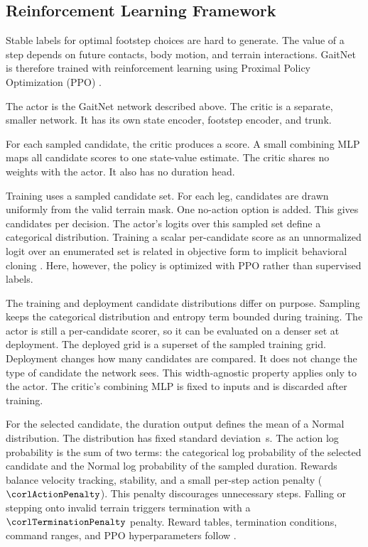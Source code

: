 \subsection{Reinforcement Learning Framework}
\label{subsec:methodology-gaitnet-training}

Stable labels for optimal footstep choices are hard to generate. The
value of a step depends on future contacts, body motion, and terrain
interactions. GaitNet is therefore trained with reinforcement learning
using Proximal Policy Optimization (PPO)
\cite{Schulman_proximal_2017}.

The actor is the GaitNet network described above. The critic is a
separate, smaller network. It has its own state encoder, footstep
encoder, and trunk. \begin{changedblock}For each sampled candidate,
the critic produces a score. A small combining MLP maps all
\corlTrainTotalCandidates{} candidate scores to one state-value
estimate. The critic shares no weights with the actor. It also has no
duration head.

Training uses a sampled candidate set. For each leg,
\numberstringnum{\corlTrainCandidatesPerLeg} candidates are drawn
uniformly from the valid terrain mask. One no-action option is added.
This gives \corlTrainTotalCandidates{} candidates per decision. The
actor's logits over this sampled set define a categorical
distribution. Training a scalar per-candidate score as an unnormalized
logit over an enumerated set is related in objective form to implicit
behavioral cloning \cite{florence_implicit_2021}. Here, however, the
policy is optimized with PPO rather than supervised labels.

The training and deployment candidate distributions differ on purpose.
Sampling keeps the categorical distribution and entropy term bounded
during training. The actor is still a per-candidate scorer, so it can
be evaluated on a denser set at deployment. The deployed grid is a
superset of the sampled training grid. Deployment changes how many
candidates are compared. It does not change the type of candidate the
network sees. This width-agnostic property applies only to the actor.
The critic's combining MLP is fixed to
\corlTrainTotalCandidates{} inputs and is discarded after training.
\end{changedblock}

For the selected candidate, the duration output defines the mean of a
Normal distribution. The distribution has fixed standard deviation
\corlDurationExploreStd\,s. The action log probability is the sum of
two terms: the categorical log probability of the selected candidate
and the Normal log probability of the sampled duration. Rewards
balance velocity tracking, stability, and a small per-step action
penalty ($\corlActionPenalty$). This penalty discourages unnecessary
steps. Falling or stepping onto invalid terrain triggers termination
with a $\corlTerminationPenalty$ penalty. Reward tables, termination
conditions, command ranges, and PPO hyperparameters follow
\cite{Sullivan2025}.

